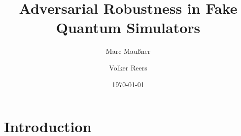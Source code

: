 \documentclass[11pt,a4paper,oneside,english]{article}
\title{Adversarial Robustness in Fake Quantum Simulators}
\author[1]{Marc Mau\ss{}ner}
\author[2]{Volker Reers}
\affil[1]{infoteam Software AG}
\affil[2]{Qseidon GmbH}
\date{\today}
\begin{document}
\maketitle

\begin{abstract}

\end{abstract}

\section{Introduction}








\printbibliography
\end{document}
